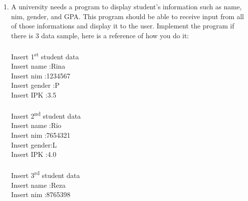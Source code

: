 \documentclass[12pt,titlepage]{article}
\begin{document}
\begin{enumerate}
\begin{verbatim}
                Land[] lands = new Land[unit];
                for (int i = 0; i < lands.length; i++) {
                    System.out.printf("Land %d\n", i+1);
                    System.out.print("length: ");
                    int l = input.nextInt();
                    System.out.print("width : ");
                    int w = input.nextInt();
                    lands[i] = new Land(l, w);
                    System.out.println();
                }
                for (int i = 0; i < lands.length; i++) {
                    System.out.printf("Land Area %d: %,d\n", i+1, lands[i].area());
                }
                int wide = 0;
                int widest = 0;
                for (int i = 0; i < lands.length; i++) {
                    if (lands[i].area() < wide) continue;
                    wide = lands[i].area();
                    widest = i + 1;
                }
                System.out.println();
                System.out.printf("The widest land is Land %d", widest);
                input.close();
            }
        }
    \end{verbatim}
    \item A university needs a program to display student’s information such as name, nim, gender, and GPA. This program should be able to receive input from all of those informations and display it to the user. Implement the program if there is 3 data sample, here is a reference of how you do it:
    \mbox{}\\ 
    \mbox{}\\ Insert 1\textsuperscript{st} student data
    \mbox{}\\ Insert name :Rina
    \mbox{}\\ Insert nim :1234567
    \mbox{}\\ Insert gender :P
    \mbox{}\\ Insert IPK :3.5
    \mbox{}\\
    \mbox{}\\ Insert 2\textsuperscript{nd} student data
    \mbox{}\\ Insert name :Rio
    \mbox{}\\ Insert nim :7654321
    \mbox{}\\ Insert gender:L
    \mbox{}\\ Insert IPK :4.0
    \mbox{}\\
    \mbox{}\\ Insert 3\textsuperscript{rd} student data
    \mbox{}\\ Insert name :Reza
    \mbox{}\\ Insert nim :8765398

\end{enumerate}
\end{document}
